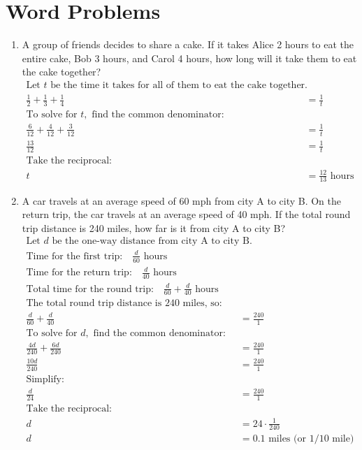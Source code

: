 \documentclass{article}
\begin{document}
\section*{Word Problems}
\begin{enumerate}[resume]
    \item A group of friends decides to share a cake. If it takes Alice 2 hours to eat the entire cake, Bob 3 hours, and Carol 4 hours, how long will it take them to eat the cake together?
\begin{align*}
\text{Let } t \text{ be the time it takes for all of them to eat the cake together.} \\
\frac{1}{2} + \frac{1}{3} + \frac{1}{4} &= \frac{1}{t} \\
\text{To solve for } t, \text{ find the common denominator:} \\
\frac{6}{12} + \frac{4}{12} + \frac{3}{12} &= \frac{1}{t} \\
\frac{13}{12} &= \frac{1}{t} \\
\text{Take the reciprocal:} \\
t &= \frac{12}{13} \text{ hours}
\end{align*}

    
    \item A car travels at an average speed of 60 mph from city A to city B. On the return trip, the car travels at an average speed of 40 mph. If the total round trip distance is 240 miles, how far is it from city A to city B?
    \begin{align*}
\text{Let } d \text{ be the one-way distance from city A to city B.} \\
\text{Time for the first trip:} \quad \frac{d}{60} \text{ hours} \\
\text{Time for the return trip:} \quad \frac{d}{40} \text{ hours} \\
\text{Total time for the round trip:} \quad \frac{d}{60} + \frac{d}{40} \text{ hours} \\
\text{The total round trip distance is 240 miles, so:} \\
\frac{d}{60} + \frac{d}{40} &= \frac{240}{1} \\
\text{To solve for } d, \text{ find the common denominator:} \\
\frac{4d}{240} + \frac{6d}{240} &= \frac{240}{1} \\
\frac{10d}{240} &= \frac{240}{1} \\
\text{Simplify:} \\
\frac{d}{24} &= \frac{240}{1} \\
\text{Take the reciprocal:} \\
d &= 24 \cdot \frac{1}{240} \\
d &= 0.1 \text{ miles} \text{ (or } 1/10 \text{ mile)}
\end{align*}

\end{enumerate}
\end{document}
